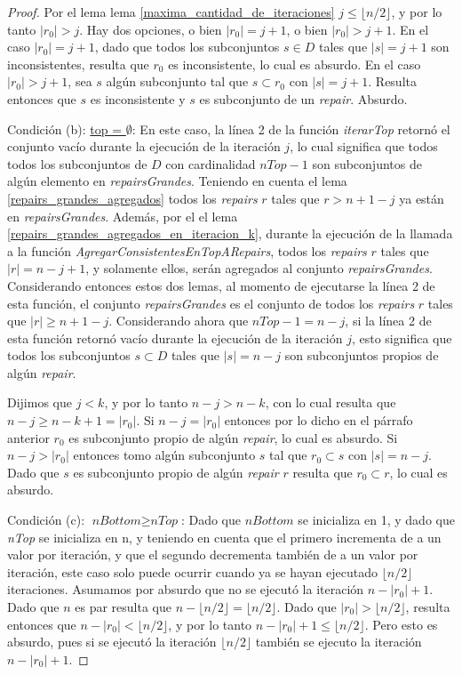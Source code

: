 \documentclass[11pt,a4paper,twoside]{tesis}
\newcommand{\parteEntera}{\lfloor n/2 \rfloor}
\begin{document}
\begin{proof}
Por el lema lema \ref{maxima_cantidad_de_iteraciones} $j\leq \parteEntera$, y por lo tanto $|r_0| > j$. Hay dos opciones, o bien $|r_0| = j + 1$, o bien $|r_0| > j + 1$. En el caso $|r_0| = j + 1$, dado que todos los subconjuntos $s \in D$ tales que $|s| = j + 1$ son inconsistentes, resulta que $r_0$ es inconsistente, lo cual es absurdo. En el caso $|r_0| > j + 1$, sea $s$ algún subconjunto tal que $s \subset r_0$ con $|s| = j + 1$. Resulta entonces que $s$ es inconsistente y $s$ es subconjunto de un \textit{repair}. Absurdo. 

Condición (b): \underline{top = $\emptyset$}: En este caso, la línea 2 de la función \textit{iterarTop} retornó el conjunto vacío durante la ejecución de la iteración $j$, lo cual significa que todos todos los subconjuntos de $D$ con cardinalidad $nTop - 1$ son subconjuntos de algún elemento en \textit{repairsGrandes}. Teniendo en cuenta el lema \ref{repairs_grandes_agregados} todos los \textit{repairs} $r$ tales que $r > n + 1 - j$ ya están en \textit{repairsGrandes}. Además, por el el lema \ref{repairs_grandes_agregados_en_iteracion_k}, durante la ejecución de la llamada a la función \textit{AgregarConsistentesEnTopARepairs}, todos los \textit{repairs} $r$ tales que $|r| = n - j + 1$, y solamente ellos, serán agregados al conjunto \textit{repairsGrandes}. Considerando entonces estos dos lemas, al momento de ejecutarse la línea 2 de esta función, el conjunto \textit{repairsGrandes} es el conjunto de todos los \textit{repairs} $r$ tales que $|r|\geq n + 1 - j$. Considerando ahora que $nTop - 1 = n -j$, si la línea 2 de esta función retornó vacío durante la ejecución de la iteración $j$, esto significa que todos los subconjuntos $s \subset D$ tales que $|s| = n - j$ son subconjuntos propios de algún \textit{repair}. 



Dijimos que $j < k$, y por lo tanto $n - j > n - k$, con lo cual resulta que $n - j \geq n - k + 1 =|r_{0}|$. Si $n - j = |r_{0}|$ entonces por lo dicho en el párrafo anterior $r_0$ es subconjunto propio de algún \textit{repair}, lo cual es absurdo. Si $n - j > |r_0|$ entonces tomo algún subconjunto $s$ tal que $r_0 \subset s$ con $|s| = n - j$. Dado que $s$ es subconjunto propio de algún \textit{repair} $r$ resulta que $r_0 \subset r$, lo cual es absurdo.

Condición (c): \underline{$\textit{nBottom} \geq \textit{nTop}$}: Dado que $\textit{nBottom}$ se inicializa en 1, y dado que \textit{nTop} se inicializa en n, y teniendo en cuenta que el primero incrementa de a un valor por iteración, y que el segundo decrementa también de a un valor por iteración, este caso solo puede ocurrir cuando ya se hayan ejecutado $\parteEntera$ iteraciones. Asumamos por absurdo que no se ejecutó la iteración $n - |r_0| + 1$. Dado que $n$ es par resulta que $n - \parteEntera = \parteEntera$. Dado que $|r_0| > \parteEntera$, resulta entonces que $n - |r_0| < \parteEntera$, y por lo tanto $n - |r_0| + 1 \leq \parteEntera$. Pero esto es absurdo, pues si se ejecutó la iteración $\parteEntera$ también se ejecuto la iteración $n - |r_0| + 1$.


\end{proof}
\end{document}
